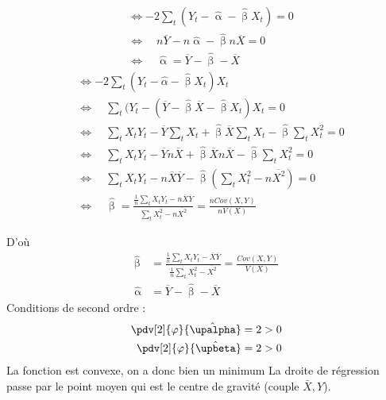 \documentclass{article}
\begin{document}
\begin{multicols}{2}
\begin{equation*}
\begin{split}
	&\Leftrightarrow -2 \sum_t (Y_t - \hat{\upalpha} - \hat{\upbeta} X_t ) = 0 \\
	&\Leftrightarrow \quad n \overline{Y} - n \hat{\upalpha} - \hat{\upbeta} n \overline{X} = 0 \\
	&\Leftrightarrow \quad \hat{\upalpha} = \overline{Y} - \hat{\upbeta} - \overline{X}
\end{split}
\end{equation*}
\columnbreak
\begin{equation*}
\begin{split}
 	&\Leftrightarrow-2 \sum_t (Y_t - \hat{\alpha} - \hat{\upbeta} X_t) X_t \\
	&\Leftrightarrow \quad \sum_t (Y_t - (\overline{Y} - \hat{\upbeta} \overline{X} - \hat{\upbeta} X_t) X_t = 0 \\
	&\Leftrightarrow \quad \sum_t X_tY_t - \overline{Y} \sum_t X_t + \hat{\upbeta} \overline{X} \sum_t X_t - \hat{\upbeta} \sum_t X_t^2 = 0\\
	&\Leftrightarrow \quad \sum_t X_tY_t - \overline{Y} n \overline{X} + \hat{\upbeta} \overline{X} n \overline{X} - \hat{\upbeta} \sum_t X_t^2 = 0 \\
	&\Leftrightarrow \quad \sum_t X_tY_t - n \overline{X} \overline{Y} - \hat{\upbeta} (\sum_t X_t^2 -n \overline{X^2}) = 0 \\
	&\Leftrightarrow \quad \hat{\upbeta} = \frac{\frac{1}{n}\sum_t X_tY_t - n \overline{X} \overline{Y}}{\sum_t X_t^2 -n \overline{X^2}} = \frac{n Cov(X,Y)}{n V(X)}
\end{split}
\end{equation*}
\end{multicols}
D'où
{
\color{red}
\begin{align*}
	\hat{\upbeta} &= \frac{\frac{1}{n}\sum_t X_tY_t - \overline{X} \overline{Y}}{\frac{1}{n}\sum_t X_t^2 - \overline{X^2}} = \frac{Cov(X,Y)}{V(X)} \\
	\hat{\upalpha} &= \overline{Y} - \hat{\upbeta} - \overline{X}
\end{align*}
}
Conditions de second ordre : 
\begin{align*}
	\pdv[2]{\varphi}{\hat{\upalpha}} &= 2 >0 \\
	\pdv[2]{\varphi}{\hat{\upbeta}} &= 2 >0
\end{align*}
La fonction est convexe, on a donc bien un minimum 
\newpage
La droite de régression passe par le point moyen qui est le centre de gravité (couple \(\bar{X},Y\)).
\end{document}
